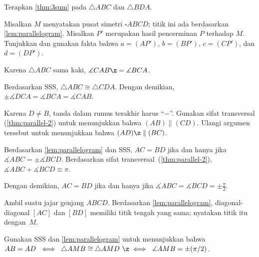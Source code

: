 



Terapkan \ref{thm:3sum} pada $\triangle ABC$ dan $\triangle BDA$.

Misalkan $M$ menyatakan pusat simetri $\square ABCD$;
titik ini ada berdasarkan \ref{lem:parallelogram}.
Misalkan $P'$ merupakan hasil pencerminan $P$ terhadap $M$.
Tunjukkan dan gunakan fakta bahwa $a=(AP')$, $b=(BP')$, $c=(CP')$, dan $d=(DP')$.

Karena $\triangle ABC$ sama kaki, $\measuredangle CAB\z=\measuredangle BCA$.

Berdasarkan SSS, $\triangle ABC\cong \triangle CDA$.
Dengan demikian,
$\pm\measuredangle DCA= \measuredangle BCA=\measuredangle CAB$.

Karena $D\ne B$, tanda dalam rumus terakhir harus ``$-$''.
Gunakan sifat transversal (\ref{thm:parallel-2}) untuk menunjukkan bahwa $(AB)\parallel (CD)$. Ulangi argumen tersebut untuk menunjukkan bahwa $(AD)\z\parallel(BC)$.

Berdasarkan \ref{lem:parallelogram} dan SSS,
$AC=BD$
jika dan hanya jika
$\measuredangle ABC=\pm \measuredangle BCD$.
Berdasarkan sifat transversal~(\ref{thm:parallel-2}),
$\measuredangle ABC+\measuredangle BCD\equiv \pi$.

Dengan demikian,
$AC=BD$
jika dan hanya jika
$\measuredangle ABC
=\measuredangle BCD
=\pm\tfrac\pi2$.

Ambil suatu jajar genjang $ABCD$.
Berdasarkan \ref{lem:parallelogram},
diagonal-diagonal $[AC]$ dan $[BD]$ memiliki titik tengah yang sama; nyatakan titik itu dengan~$M$.

Gunakan SSS dan \ref{lem:parallelogram} untuk menunjukkan bahwa
$AB=AD\ \iff\ \triangle AMB
\cong
\triangle AMD\ \z\iff\ \measuredangle AMB
=
\pm\tfrac\pi2$.

